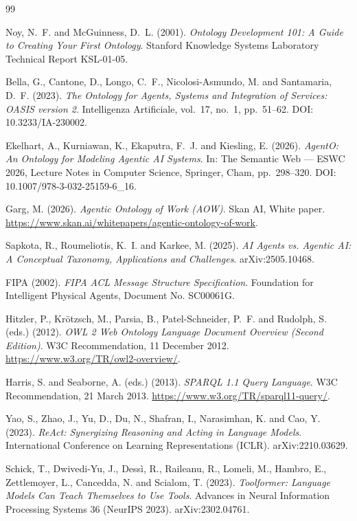 \documentclass[10pt, a4paper, twocolumn]{article}
\begin{document}
\renewcommand{\refname}{Kaynak\c{c}a}
\begin{thebibliography}{99}

Noy, N.~F. and McGuinness, D.~L. (2001).
\textit{Ontology Development 101: A Guide to Creating Your First Ontology}.
Stanford Knowledge Systems Laboratory Technical Report KSL-01-05.

Bella, G., Cantone, D., Longo, C.~F., Nicolosi-Asmundo, M. and Santamaria, D.~F. (2023).
\textit{The Ontology for Agents, Systems and Integration of Services: OASIS version 2}.
Intelligenza Artificiale, vol.~17, no.~1, pp.~51--62.
DOI: 10.3233/IA-230002.

Ekelhart, A., Kurniawan, K., Ekaputra, F.~J. and Kiesling, E. (2026).
\textit{AgentO: An Ontology for Modeling Agentic AI Systems}.
In: The Semantic Web --- ESWC 2026, Lecture Notes in Computer Science, Springer, Cham, pp.~298--320.
DOI: 10.1007/978-3-032-25159-6\_16.

Garg, M. (2026).
\textit{Agentic Ontology of Work (AOW)}.
Skan AI, White paper.
\url{https://www.skan.ai/whitepapers/agentic-ontology-of-work}.

Sapkota, R., Roumeliotis, K.~I. and Karkee, M. (2025).
\textit{AI Agents vs. Agentic AI: A Conceptual Taxonomy, Applications and Challenges}.
arXiv:2505.10468.

FIPA (2002).
\textit{FIPA ACL Message Structure Specification}.
Foundation for Intelligent Physical Agents, Document No. SC00061G.

Hitzler, P., Kr\"otzsch, M., Parsia, B., Patel-Schneider, P.~F. and Rudolph, S. (eds.) (2012).
\textit{OWL 2 Web Ontology Language Document Overview (Second Edition)}.
W3C Recommendation, 11 December 2012.
\url{https://www.w3.org/TR/owl2-overview/}.

Harris, S. and Seaborne, A. (eds.) (2013).
\textit{SPARQL 1.1 Query Language}.
W3C Recommendation, 21 March 2013.
\url{https://www.w3.org/TR/sparql11-query/}.

Yao, S., Zhao, J., Yu, D., Du, N., Shafran, I., Narasimhan, K. and Cao, Y. (2023).
\textit{ReAct: Synergizing Reasoning and Acting in Language Models}.
International Conference on Learning Representations (ICLR).
arXiv:2210.03629.

Schick, T., Dwivedi-Yu, J., Dess\`i, R., Raileanu, R., Lomeli, M., Hambro, E., Zettlemoyer, L., Cancedda, N. and Scialom, T. (2023).
\textit{Toolformer: Language Models Can Teach Themselves to Use Tools}.
Advances in Neural Information Processing Systems 36 (NeurIPS 2023).
arXiv:2302.04761.


\end{thebibliography}
\end{document}
